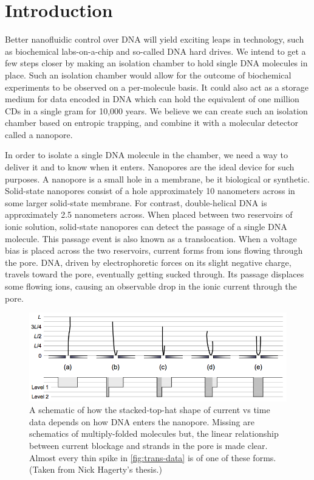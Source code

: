 \documentclass[aps,prl,preprint,groupedaddress]{revtex4}
\begin{document}
\section{Introduction}

Better nanofluidic control over DNA will yield exciting leaps in technology, such as biochemical labs-on-a-chip and so-called DNA hard drives.
We intend to get a few steps closer by making an isolation chamber to hold single DNA molecules in place.
Such an isolation chamber would allow for the outcome of biochemical experiments to be observed on a per-molecule basis.
It could also act as a storage medium for data encoded in DNA which can hold the equivalent of one million CDs in a single gram for 10,000 years\cite{dna-hard-drive}.
We believe we can create such an isolation chamber based on entropic trapping, and combine it with a molecular detector called a nanopore.

In order to isolate a single DNA molecule in the chamber, we need a way to deliver it and to know when it enters.
Nanopores are the ideal device for such purposes.
A nanopore is a small hole in a membrane, be it biological or synthetic.
Solid-state nanopores consist of a hole approximately 10 nanometers across in some larger solid-state membrane.
For contrast, double-helical DNA is approximately 2.5 nanometers across.
When placed between two reservoirs of ionic solution, solid-state nanopores can detect the passage of a single DNA molecule.
This passage event is also known as a translocation.
When a voltage bias is placed across the two reservoirs, current forms from ions flowing through the pore.
DNA, driven by electrophoretic forces on its slight negative charge, travels toward the pore, eventually getting sucked through.
Its passage displaces some flowing ions, causing an observable drop in the ionic current through the pore.

\begin{figure}[ht]
\centering
\includegraphics[width=1\textwidth]{figures/dna-approach}
\caption{A schematic of how the stacked-top-hat shape of current vs time data depends on how DNA enters the nanopore. Missing are schematics of multiply-folded molecules but, the linear relationship between current blockage and strands in the pore is made clear. Almost every thin spike in \ref{fig:trans-data} is of one of these forms. (Taken from Nick Hagerty's thesis.)}
\label{fig:dna-approach}
\end{figure}
\end{document}
